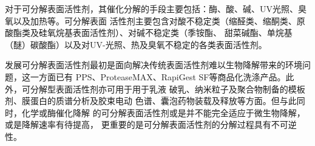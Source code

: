 \documentclass[bachelor,fandolfonts,replaceperiod]{jnuthesis}
\begin{document}
    对于可分解表面活性剂，其催化分解的手段主要包括：酶、酸、碱、UV光照、臭氧以及加热等。可分解表面
    活性剂主要包含对酸不稳定类（缩醛类、缩酮类、原酸酯类及硅氧烷基表面活性剂）、对碱不稳定类（季铵酯、
    甜菜碱酯、单烷基（醚）碳酸酯）以及对UV-光照、热及臭氧不稳定的各类表面活性剂\cite{hellberg2000,tehrani2007,shukla2010,narayanan2008}。    
%        
%        
%    

    
    发展可分解表面活性剂最初是面向解决传统表面活性剂难以生物降解带来的环境问题，这一方面已有
    PPS、ProteaseMAX、RapiGest SF等商品化洗涤产品。此外，可分解型表面活性剂亦可用于用于乳液
    破乳、纳米粒子及聚合物制备的模板剂\cite{liu2007}、膜蛋白的质谱分析\cite{norris2003}及胶束电动
    色谱\cite{stanley2012}、囊泡药物装载及释放\cite{guo2012}等方面。但与此同时，化学或酶催化降解
    的可分解表面活性剂或是并不能完全适应于微生物降解\cite{tehrani2007}，或是降解速率有待提高，
    更重要的是可分解表面活性剂的分解过程具有不可逆性\cite{liu2007}。
    
\end{document}
